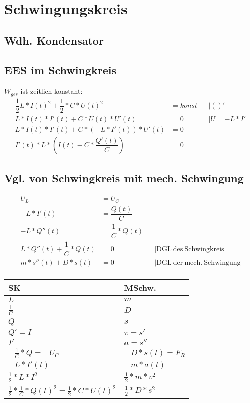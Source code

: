 \section{Schwingungskreis}
\subsection{Wdh. Kondensator}
\subsection{EES im Schwingkreis}
$W_{ges}$ ist zeitlich konstant:
\begin{align*}
	\dfrac{1}{2}L*I(t)^2+\dfrac{1}{2}*C*U(t)^2&=konst&&|()'\\
	L*I(t)*I'(t)+C*U(t)*U'(t)&=0&&|U=-L*I'\\
	L*I(t)*I'(t)+C*(-L*I'(t))*U'(t)&=0\\
	I'(t)*L*\left(I(t)-C*\dfrac{Q'(t)}{C}\right)&=0
\end{align*}
\subsection{Vgl. von Schwingkreis mit mech. Schwingung}
\begin{align*}
	U_L&=U_C\\
	-L*I'(t)&=\dfrac{Q(t)}{C}\\
	-L*Q''(t)&=\dfrac{1}{C}*Q(t)\\
	L*Q''(t)+\dfrac{1}{C}*Q(t)&=0&&|\mathrm{DGL\ des\ Schwingkreis}\\
	m*s''(t)+D*s(t)&=0&&|\mathrm{DGL\ der\ mech.\ Schwingung}\\
\end{align*}
\begin{tabular}{l|l}
	SK & MSchw.\\
	\hline $L$&$m$\\
	$\frac{1}{C}$&$D$\\
	$Q$&$s$\\
	$Q'=I$&$v=s'$\\
	$I'$&$a=s''$\\
	$-\frac{1}{C}*Q=-U_C$&$-D*s(t)=F_R$\\
	$-L*I'(t)$ &$-m*a(t)$\\
	$\frac{1}{2}*L*I^2$&$\frac{1}{2}*m*v^2$\\
	$\frac{1}{2}*\frac{1}{C}*Q(t)^2=\frac{1}{2}*C*U(t)^2$&$\frac{1}{2}*D*s^2$	
\end{tabular}

